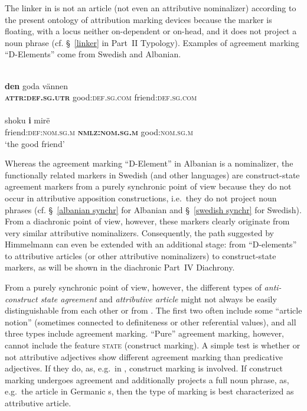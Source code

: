The linker in  is not an article (not even an attributive nominalizer) according to the present ontology of attribution marking devices because the marker is floating, with a locus neither on-dependent or on-head, and it does not project a noun phrase (cf. \S~\ref{linker} in Part~II Typology). Examples of agreement marking “D-Elements” come from Swedish and Albanian.
\begin{exe}
\ex
\begin{xlist}
\ex 
{}\\
\gll	\textbf{den} goda vännen\\
	\textbf{\textsc{attr:def.sg.utr}} good:\textsc{def.sg.com} friend:\textsc{def.sg.com}\\
\ex 
{}\\
\gll	shoku \textbf{i} mirë\\
	friend:\textsc{def:nom.sg.m} \textbf{\textsc{nmlz:nom.sg.m}} good:\textsc{nom.sg.m}\\
\glt	‘the good friend’
\end{xlist}
\end{exe}
Whereas the agreement marking “D-Element” in Albanian is a nominalizer, the functionally related markers in Swedish (and other languages) are construct-state agreement markers from a purely synchronic point of view because they do not occur in attributive apposition constructions, i.e.~they do not project noun phrases (cf. \S~\ref{albanian synchr} for Albanian and \S~\ref{swedish synchr} for Swedish). From a diachronic point of view, however, these markers clearly originate from very similar attributive nominalizers. Consequently, the  path suggested by Himmelmann \citeyear{himmelmann1997} can even be extended with an additional stage: from “D-elements” to attributive articles (or other attributive nominalizers) to construct-state markers, as will be shown in the diachronic Part~IV Diachrony.

From a purely synchronic point of view, however, the different types of \emph{anti\hyp{}construct state agreement} and \emph{attributive article} might not always be easily distinguishable from each other or from \emph{}. The first two often include some “article notion” (sometimes connected to definiteness or other referential values), and all three types include agreement marking. “Pure” agreement marking, however, cannot include the feature \textsc{state} (construct marking). A simple test is whether or not attributive adjectives show different agreement marking than predicative adjectives. If they do, as, e.g.~in , construct marking is involved. If construct marking undergoes agreement and additionally projects a full noun phrase, as, e.g.~the article in Germanic s, then the type of marking is best characterized as attributive article.


